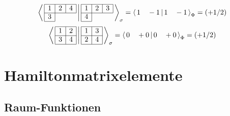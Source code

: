 \documentclass[fleqn]{article}%
\begin{document}
\begin{dmath*}\bra{\,\begin{array}{|c|c|c|} \hline 1 & 2 & 4\\ \cline{1-3} 3\\ \cline{1-1} \end{array} \,} \ket{\,\begin{array}{|c|c|c|} \hline 1 & 2 & 3\\ \cline{1-3} 4\\ \cline{1-1} \end{array} \,}_{\sigma }=\bra{\, 1\quad -1 \,} \ket{\, 1\quad -1 \,}_{\Phi} = \left( + 1/2\right) \end{dmath*}%
\vspace{0.25cm}%
\begin{dmath*}\bra{\,\begin{array}{|c|c|} \hline 1 & 2\\ \cline{1-2} 3 & 4\\ \cline{1-2} \end{array} \,} \ket{\,\begin{array}{|c|c|} \hline 1 & 3\\ \cline{1-2} 2 & 4\\ \cline{1-2} \end{array} \,}_{\sigma }=\bra{\, 0\quad +0 \,} \ket{\, 0\quad +0 \,}_{\Phi} = \left( + 1/2\right) \end{dmath*}%
\vspace{0.25cm}%
\newpage%
\section{Hamiltonmatrixelemente}%
\label{sec:Hamiltonmatrixelemente}%

%
\subsection{Raum{-}Funktionen}%
\label{subsec:Raum{-}Funktionen}%
\end{document}
